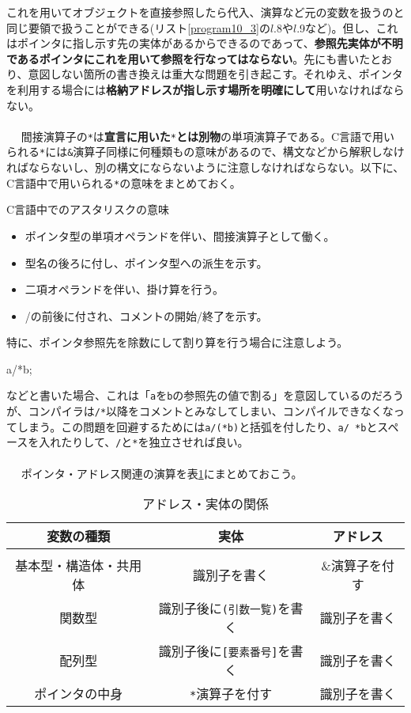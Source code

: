 これを用いてオブジェクトを直接参照したら代入、演算など元の変数を扱うのと同じ要領で扱うことができる(リスト\ref{program10_3}の$l$.8や$l$.9など)。但し、これはポインタに指し示す先の実体があるからできるのであって、\textbf{参照先実体が不明であるポインタにこれを用いて参照を行なってはならない}。先にも書いたとおり、意図しない箇所の書き換えは重大な問題を引き起こす。それゆえ、ポインタを利用する場合には\textbf{格納アドレスが指し示す場所を明確にして}用いなければならない。
\\ \\　
間接演算子の\verb|*|は\textbf{宣言に用いた}\verb|*|\textbf{とは別物}の単項演算子である。C言語で用いられる\verb|*|には\verb|&|演算子同様に何種類もの意味があるので、構文などから解釈しなければならないし、別の構文にならないように注意しなければならない。以下に、C言語中で用いられる\verb|*|の意味をまとめておく。
\begin{itembox}[l]{C言語中でのアスタリスクの意味}
\begin{itemize}
\item ポインタ型の単項オペランドを伴い、間接演算子として働く。
\item 型名の後ろに付し、ポインタ型への派生を示す。
\item 二項オペランドを伴い、掛け算を行う。
\item /の前後に付され、コメントの開始/終了を示す。
\end{itemize}
\end{itembox}
特に、ポインタ参照先を除数にして割り算を行う場合に注意しよう。
\begin{code}
a/*b;
\end{code}
などと書いた場合、これは「\verb|a|を\verb|b|の参照先の値で割る」を意図しているのだろうが、コンパイラは\verb|/*|以降をコメントとみなしてしまい、コンパイルできなくなってしまう。この問題を回避するためには\verb|a/(*b)|と括弧を付したり、\verb|a/ *b|とスペースを入れたりして、\verb|/|と\verb|*|を独立させれば良い。
\\ \\　
ポインタ・アドレス関連の演算を表\ref{chap10_tab1}にまとめておこう。
\begin{table}[htb]
\centering
\caption{アドレス・実体の関係}\label{chap10_tab1}
\begin{tabular}{|c||c|c|}\hline
変数の種類&実体&アドレス\\ \hline
&&\\[-15.5pt] \hline
基本型・構造体・共用体&識別子を書く&\&演算子を付す\\ \hline
関数型&識別子後に\verb|(引数一覧)|を書く&識別子を書く\\ \hline
配列型&識別子後に\verb|[要素番号]|を書く&識別子を書く\\ \hline
ポインタの中身&\verb|*|演算子を付す&識別子を書く\\ \hline
\end{tabular}
\end{table}

